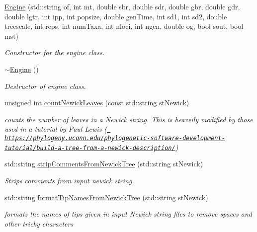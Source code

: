 \begin{DoxyCompactItemize}
\item 
\mbox{\hyperlink{class_engine_a8b4741a93ca42e6ef32ea49703f9ed70}{Engine}} (std\+::string of, int mt, double sbr, double sdr, double gbr, double gdr, double lgtr, int ipp, int popsize, double gen\+Time, int sd1, int sd2, double treescale, int reps, int num\+Taxa, int nloci, int ngen, double og, bool sout, bool mst)
\begin{DoxyCompactList}\small\item\em Constructor for the engine class. \end{DoxyCompactList}\item 
\mbox{\hyperlink{class_engine_a8ef7030a089ecb30bbfcb9e43094717a}{$\sim$\+Engine}} ()
\begin{DoxyCompactList}\small\item\em Destructor of engine class. \end{DoxyCompactList}\item 
unsigned int \mbox{\hyperlink{class_engine_ad3629de6e2e7b9f0c60c19cc38d9afee}{count\+Newick\+Leaves}} (const std\+::string st\+Newick)
\begin{DoxyCompactList}\small\item\em counts the number of leaves in a Newick string. This is heaveily modified by those used in a tutorial by Paul Lewis (\href{https://phylogeny.uconn.edu/phylogenetic-software-development-tutorial/build-a-tree-from-a-newick-description/}{\texttt{ https\+://phylogeny.\+uconn.\+edu/phylogenetic-\/software-\/development-\/tutorial/build-\/a-\/tree-\/from-\/a-\/newick-\/description/}}) \end{DoxyCompactList}\item 
std\+::string \mbox{\hyperlink{class_engine_a204081a6384298f9804e8048f09a03b0}{strip\+Comments\+From\+Newick\+Tree}} (std\+::string st\+Newick)
\begin{DoxyCompactList}\small\item\em Strips comments from input newick string. \end{DoxyCompactList}\item 
std\+::string \mbox{\hyperlink{class_engine_a34b92fdcc419808389cf55fc387743b6}{format\+Tip\+Names\+From\+Newick\+Tree}} (std\+::string st\+Newick)
\begin{DoxyCompactList}\small\item\em formats the names of tips given in input Newick string files to remove spaces and other tricky characters \end{DoxyCompactList}\item 

\end{DoxyCompactItemize}
